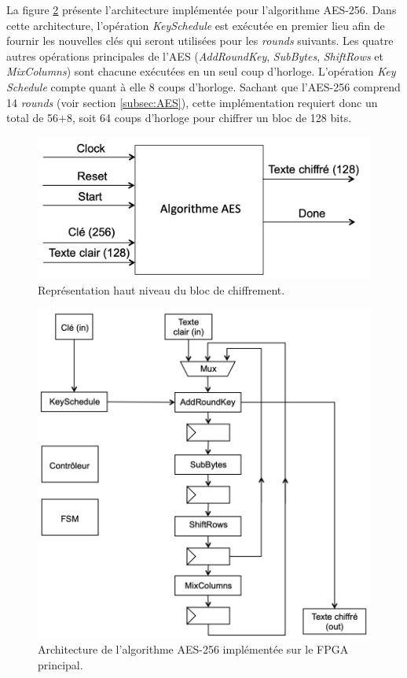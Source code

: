 \documentclass[oneside]{book}
\begin{document}
La figure \ref{fig:FPGA_arch} présente l'architecture implémentée pour l'algorithme AES-256. Dans cette architecture, l'opération \textit{KeySchedule} est exécutée en premier lieu afin de fournir les nouvelles clés qui seront utilisées pour les \textit{rounds} suivants. Les quatre autres opérations principales de l'AES (\textit{AddRoundKey}, \textit{SubBytes}, \textit{ShiftRows} et \textit{MixColumns}) sont chacune exécutées en un seul coup d'horloge. L'opération \textit{Key Schedule} compte quant à elle 8 coups d'horloge. Sachant que l'AES-256 comprend 14 \textit{rounds} (voir section \ref{subsec:AES}), cette implémentation requiert donc un total de 56+8, soit 64 coups d'horloge pour chiffrer un bloc de 128 bits.

\begin{figure}[htbp]
    \centering
    \includegraphics[scale=0.45]{image/FPGA_AES_TOP}
    \caption{Représentation haut niveau du bloc de chiffrement.}
    \label{fig:FPGA_AES_TOP} 
\end{figure}

\begin{figure}[htbp]
    \centering
    \includegraphics[scale=0.9]{image/FPGA_arch}
    \caption{Architecture de l'algorithme AES-256 implémentée sur le FPGA principal.}
    \label{fig:FPGA_arch} 
\end{figure}
\end{document}
